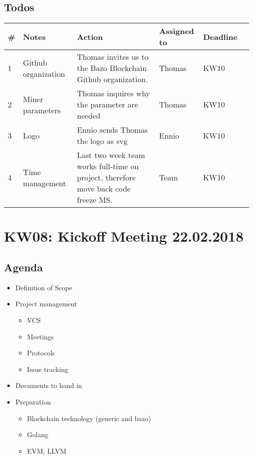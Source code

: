 \subsection{Todos}
\begin{table}[H]
\centering
\begin{tabular}{L{1cm} L{3cm} L{6cm} L{1.5cm} R{1.5cm} R{1cm}}
\toprule
\# & Notes               & Action                                                                             & Assigned to & Deadline \\   & Github organization & Thomas invites us to the Bazo Blockchain Github organization.                      & Thomas      & KW10     \\
2  & Miner parameters    & Thomas inquires why the parameter are needed                                       & Thomas      & KW10     \\
3  & Logo                & Ennio sends Thomas the logo as svg                                                 & Ennio       & KW10     \\
4  & Time management     & Last two week team works full-time on project, therefore move back code freeze MS. & Team        & KW10     \\ \bottomrule
\end{tabular}
\end{table}

\section{KW08: Kickoff Meeting 22.02.2018}
\subsection{Agenda}

\begin{itemize}
\item
  Definition of Scope
\item
  Project management

  \begin{itemize}
  \item
    VCS
  \item
    Meetings
  \item
    Protocols
  \item
    Issue tracking
  \end{itemize}
\item
  Documents to hand in
\item
  Preparation

  \begin{itemize}
  \item
    Blockchain technology (generic and bazo)
  \item
    Golang
  \item
    EVM, LLVM
  \end{itemize}
\end{itemize}

